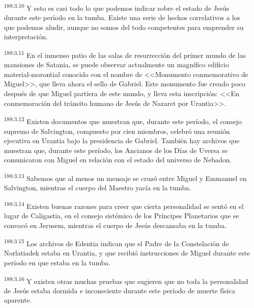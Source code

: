 \par 
\textsuperscript{188:3.10} Y esto es casi todo lo que podemos indicar sobre el estado de Jesús durante este período en la tumba. Existe una serie de hechos correlativos a los que podemos aludir, aunque no somos del todo competentes para emprender su interpretación.

\par 
\textsuperscript{188:3.11} En el inmenso patio de las salas de resurrección del primer mundo de las mansiones de Satania, se puede observar actualmente un magnífico edificio material-morontial conocido con el nombre de <<Monumento conmemorativo de Miguel>>, que lleva ahora el sello de Gabriel. Este monumento fue creado poco después de que Miguel partiera de este mundo, y lleva esta inscripción: <<En conmemoración del tránsito humano de Jesús de Nazaret por Urantia>>.

\par 
\textsuperscript{188:3.12} Existen documentos que muestran que, durante este período, el consejo supremo de Salvington, compuesto por cien miembros, celebró una reunión ejecutiva en Urantia bajo la presidencia de Gabriel. También hay archivos que muestran que, durante este período, los Ancianos de los Días de Uversa se comunicaron con Miguel en relación con el estado del universo de Nebadon.

\par 
\textsuperscript{188:3.13} Sabemos que al menos un mensaje se cruzó entre Miguel y Emmanuel en Salvington, mientras el cuerpo del Maestro yacía en la tumba.

\par 
\textsuperscript{188:3.14} Existen buenas razones para creer que cierta personalidad se sentó en el lugar de Caligastia, en el consejo sistémico de los Príncipes Planetarios que se convocó en Jerusem, mientras el cuerpo de Jesús descansaba en la tumba.

\par 
\textsuperscript{188:3.15} Los archivos de Edentia indican que el Padre de la Constelación de Norlatiadek estaba en Urantia, y que recibió instrucciones de Miguel durante este período en que estaba en la tumba.

\par 
\textsuperscript{188:3.16} Y existen otras muchas pruebas que sugieren que no toda la personalidad de Jesús estaba dormida e inconsciente durante este período de muerte física aparente.

